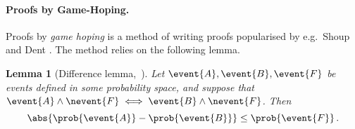 \let\accentvec\vec \documentclass[runningheads]{llncs}
\newtheorem{lemma}[theorem]{Lemma}
\begin{document}
\paragraph{Proofs by Game-Hoping.}
Proofs by \emph{game hoping} is a method of writing proofs popularised by e.g.~Shoup \cite{EPRINT:Shoup04} and Dent \cite{EPRINT:Dent06c}. The method relies on the following lemma.

\begin{lemma}[Difference lemma,~{\cite[Lemma 1]{EPRINT:Shoup04}}]
	\label{lem:difference_lemma}
	Let $\event{A}, \event{B}, \event{F}$ be events defined in some probability
	space, and suppose that $\event{A} \land \nevent{F} \iff \event{B}
		\land \nevent{F}$.  Then 
	\[
		\abs{\prob{\event{A}} - \prob{\event{B}}} \leq \prob{\event{F}}\,.
	\]
\end{lemma}
\end{document}
